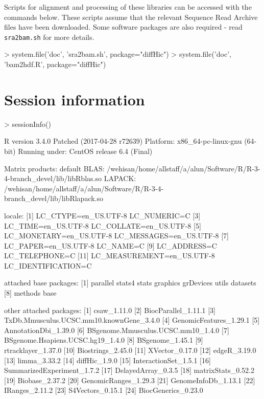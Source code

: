 \documentclass[12pt]{report}
\renewenvironment{Schunk}{\vspace{0pt}}{\vspace{0pt}}
\newcommand{\code}[1]{{\small\texttt{#1}}}
\begin{document}
Scripts for alignment and processing of these libraries can be accessed with the commands below.
These scripts assume that the relevant Sequence Read Archive files have been downloaded.
Some software packages are also required - read \code{sra2bam.sh} for more details.

\begin{Schunk}
\begin{Sinput}
> system.file('doc', 'sra2bam.sh', package="diffHic")
> system.file('doc', 'bam2hdf.R', package="diffHic")
\end{Sinput}
\end{Schunk}

\section{Session information}
\begin{Schunk}
\begin{Sinput}
> sessionInfo()
\end{Sinput}
\begin{Soutput}
R version 3.4.0 Patched (2017-04-28 r72639)
Platform: x86_64-pc-linux-gnu (64-bit)
Running under: CentOS release 6.4 (Final)

Matrix products: default
BLAS: /wehisan/home/allstaff/a/alun/Software/R/R-3-4-branch_devel/lib/libRblas.so
LAPACK: /wehisan/home/allstaff/a/alun/Software/R/R-3-4-branch_devel/lib/libRlapack.so

locale:
 [1] LC_CTYPE=en_US.UTF-8       LC_NUMERIC=C              
 [3] LC_TIME=en_US.UTF-8        LC_COLLATE=en_US.UTF-8    
 [5] LC_MONETARY=en_US.UTF-8    LC_MESSAGES=en_US.UTF-8   
 [7] LC_PAPER=en_US.UTF-8       LC_NAME=C                 
 [9] LC_ADDRESS=C               LC_TELEPHONE=C            
[11] LC_MEASUREMENT=en_US.UTF-8 LC_IDENTIFICATION=C       

attached base packages:
[1] parallel  stats4    stats     graphics  grDevices utils     datasets 
[8] methods   base     

other attached packages:
 [1] csaw_1.11.0                             
 [2] BiocParallel_1.11.1                     
 [3] TxDb.Mmusculus.UCSC.mm10.knownGene_3.4.0
 [4] GenomicFeatures_1.29.1                  
 [5] AnnotationDbi_1.39.0                    
 [6] BSgenome.Mmusculus.UCSC.mm10_1.4.0      
 [7] BSgenome.Hsapiens.UCSC.hg19_1.4.0       
 [8] BSgenome_1.45.1                         
 [9] rtracklayer_1.37.0                      
[10] Biostrings_2.45.0                       
[11] XVector_0.17.0                          
[12] edgeR_3.19.0                            
[13] limma_3.33.2                            
[14] diffHic_1.9.0                           
[15] InteractionSet_1.5.1                    
[16] SummarizedExperiment_1.7.2              
[17] DelayedArray_0.3.5                      
[18] matrixStats_0.52.2                      
[19] Biobase_2.37.2                          
[20] GenomicRanges_1.29.3                    
[21] GenomeInfoDb_1.13.1                     
[22] IRanges_2.11.2                          
[23] S4Vectors_0.15.1                        
[24] BiocGenerics_0.23.0                     


\end{Soutput}
\end{Schunk}
\end{document}
